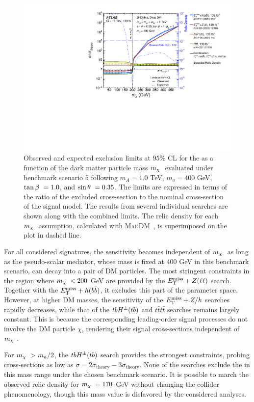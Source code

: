 \begin{figure}[h!]
    \centering
    \includegraphics[width=0.6\linewidth]{figures/fig_08.pdf}
    \caption{Observed and expected exclusion limits at $95\%$ CL for the \thdma as a function of the dark matter particle mass $m_{\chi}~$ evaluated under benchmark scenario 5 following $m_A=1.0$ TeV, $m_a=400$ GeV, $\tan\beta~=1.0$, and $\sin\theta~=0.35$. The limits are expressed in terms of the ratio of the excluded cross-section to the nominal cross-section of the signal model. The results from several individual searches are shown along with the combined limits. The relic density for each $m_{\chi}~$ assumption, calculated with \textsc{MadDM}~\cite{Ambrogi:2018jqj}, is superimposed on the plot in dashed line. }
    \label{fig:result-mX-scan}
\end{figure} 

For all considered signatures, the sensitivity becomes independent of $m_{\chi}~$ as long as the pseudo-scalar mediator, whose mass is fixed at 400 GeV in this benchmark scenario, can decay into a pair of DM particles. The most stringent constraints in the region where $m_{\chi}~<200$ GeV are provided by the $E_{\mathrm{T}}^{\mathrm{miss}}+Z(\ell\ell)$ search. Together with the $E_{\mathrm{T}}^{\mathrm{miss}}+h(b\bar{b})$, it excludes this part of the parameter space. However, at higher DM masses, the sensitivity of the $E_{\mathrm{T}}^{\mathrm{miss}}+Z/h$ searches rapidly decreases, while that of the $tbH^{\pm}(tb)$ and $t\bar{t}t\bar{t}$ searches remains largely constant. This is because the corresponding leading-order signal processes do not involve the DM particle $\chi$, rendering their signal cross-sections independent of $m_{\chi}~$. 

For $m_{\chi}~>m_a/2$, the $tbH^{\pm}(tb)$ search provides the strongest constraints, probing cross-sections as low as $\sigma =2\sigma_{\mathrm{theory}} - 3\sigma_{\mathrm{theory}}$. None of the searches exclude the \thdma in this mass range under the chosen benchmark scenario. It is possible to march the observed relic density for $m_{\chi}~=170$ GeV without changing the collider phenomenology, though this mass value is disfavored by the considered analyses. 


